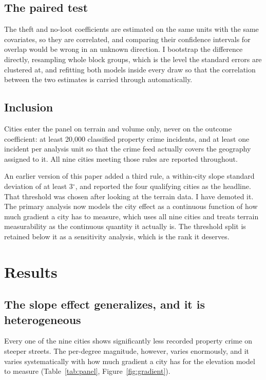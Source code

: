 \documentclass[12pt,letterpaper]{article}
\begin{document}
\subsection{The paired test}

The theft and no-loot coefficients are estimated on the same units with the same
covariates, so they are correlated, and comparing their confidence intervals for
overlap would be wrong in an unknown direction. I bootstrap the difference directly,
resampling whole block groups, which is the level the standard errors are clustered
at, and refitting both models inside every draw so that the correlation between the
two estimates is carried through automatically.

\subsection{Inclusion}

Cities enter the panel on terrain and volume only, never on the outcome coefficient:
at least 20,000 classified property crime incidents, and at least one incident per
analysis unit so that the crime feed actually covers the geography assigned to it.
All nine cities meeting those rules are reported throughout.

An earlier version of this paper added a third rule, a within-city slope standard
deviation of at least 3$^\circ$, and reported the four qualifying cities as the
headline. That threshold was chosen after looking at the terrain data. I have
demoted it. The primary analysis now models the city effect as a continuous
function of how much gradient a city has to measure, which uses all nine cities and
treats terrain measurability as the continuous quantity it actually is. The
threshold split is retained below it as a sensitivity analysis, which is the rank
it deserves.

\section{Results}

\subsection{The slope effect generalizes, and it is heterogeneous}

Every one of the nine cities shows significantly less recorded property crime on
steeper streets. The per-degree magnitude, however, varies enormously, and it varies
systematically with how much gradient a city has for the elevation model to measure
(Table~\ref{tab:panel}, Figure~\ref{fig:gradient}).
\end{document}
